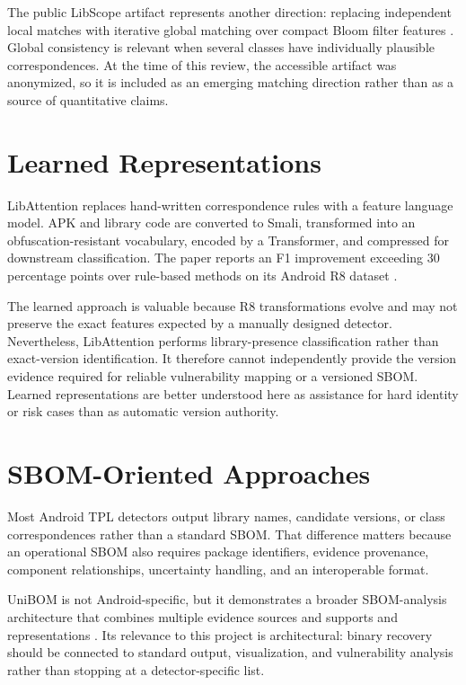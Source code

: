 The public LibScope artifact represents another direction: replacing
independent local matches with iterative global matching over compact Bloom
filter features \cite{libscopeArtifact}. Global consistency is relevant when
several classes have individually plausible correspondences. At the time of
this review, the accessible artifact was anonymized, so it is included as an
emerging matching direction rather than as a source of quantitative claims.

\section{Learned Representations}

LibAttention replaces hand-written correspondence rules with a feature
language model. APK and library code are converted to Smali, transformed into
an obfuscation-resistant vocabulary, encoded by a Transformer, and compressed
for downstream classification. The paper reports an F1 improvement exceeding
30 percentage points over rule-based methods on its Android R8 dataset
\cite{pan2025libattention}.

The learned approach is valuable because R8 transformations evolve and may not
preserve the exact features expected by a manually designed detector.
Nevertheless, LibAttention performs library-presence classification rather
than exact-version identification. It therefore cannot independently provide
the version evidence required for reliable vulnerability mapping or a
versioned SBOM. Learned representations are better understood here as
assistance for hard identity or risk cases than as automatic version
authority.

\section{SBOM-Oriented Approaches}

Most Android TPL detectors output library names, candidate versions, or class
correspondences rather than a standard SBOM. That difference matters because
an operational SBOM also requires package identifiers, evidence provenance,
component relationships, uncertainty handling, and an interoperable format.

UniBOM is not Android-specific, but it demonstrates a broader SBOM-analysis
architecture that combines multiple evidence sources and supports
\CycloneDX and \SPDX representations \cite{safronov2025unibom}. Its relevance
to this project is architectural: binary recovery should be connected to
standard output, visualization, and vulnerability analysis rather than
stopping at a detector-specific list.

